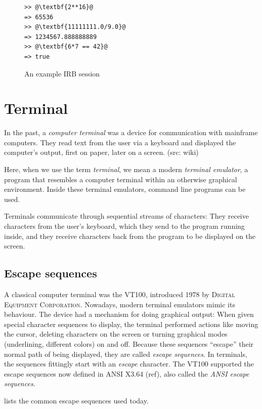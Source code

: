 \documentclass[paper=a4,twoside,abstract=on,cleardoublepage=empty,numbers=noenddot,toc=bib,12pt,appendixprefix=true]{scrreprt}
\begin{document}
\begin{figure}[tb]
    \begin{lstlisting}[escapechar=@]
>> @\textbf{2**16}@
=> 65536
>> @\textbf{11111111.0/9.0}@
=> 1234567.888888889
>> @\textbf{6*7 == 42}@
=> true
    \end{lstlisting}
    \centering
    \caption{An example IRB session}
    \label{fig:irb}
\end{figure}

\section{Terminal}

In the past, a \emph{computer terminal} was a device for communication with mainframe computers. They read text from the user via a keyboard and displayed the computer's output, first on paper, later on a screen. (src: wiki)

Here, when we use the term \emph{terminal}, we mean a modern \emph{terminal emulator}, a program that resembles a computer terminal within an otherwise graphical environment. Inside these terminal emulators, command line programs can be used.

Terminals communicate through sequential streams of characters: They receive characters from the user's keyboard, which they send to the program running inside, and they receive characters back from the program to be displayed on the screen.

\subsection{Escape sequences}

A classical computer terminal was the \textsc{VT100}, introduced 1978 by \textsc{Digital Equipment Corporation}. Nowadays, modern terminal emulators mimic its behaviour. The device had a mechanism for doing graphical output: When given special character sequences to display, the terminal performed actions like moving the cursor, deleting characters on the screen or turning graphical modes (underlining, different colors) on and off. Because these sequences “escape” their normal path of being displayed, they are called \emph{escape sequences}. In terminals, the sequences fittingly start with an \emph{escape} character. The \textsc{VT100} supported the escape sequences now defined in ANSI X3.64 (ref), also called the \emph{ANSI escape sequences}.

 lists the common escape sequences used today.
\end{document}
